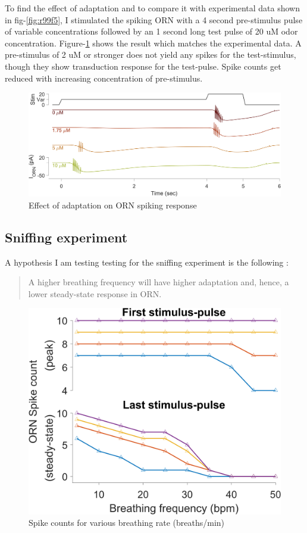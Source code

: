 \documentclass[
]{article}
\begin{document}
To find the effect of adaptation and to compare it with experimental data shown in fig-\ref{fig:r99f5}, I stimulated the spiking ORN with a 4 second pre-stimulus pulse of variable concentrations followed by an 1 second long test pulse of 20 uM odor concentration. Figure-\ref{fig:rAdp} shows the result which matches the experimental data. A pre-stimulus of 2 uM or stronger does not yield any spikes for the test-stimulus, though they show transduction response for the test-pulse. Spike counts get reduced with increasing concentration of pre-stimulus.

\begin{figure}

{\centering \includegraphics[width=0.9\linewidth]{figs/v1/fig_spk_compare_adaptation} 

}

\caption{Effect of adaptation on ORN spiking response}\label{fig:rAdp}
\end{figure}

\hypertarget{sniffing-experiment-1}{%
\subsection{Sniffing experiment}\label{sniffing-experiment-1}}

A hypothesis I am testing testing for the sniffing experiment is the following :

\begin{quote}
A higher breathing frequency will have higher adaptation and, hence, a lower steady-state response in ORN.
\end{quote}

\begin{figure}

{\centering \includegraphics[width=0.5\linewidth]{figs/v1/fig_sniff_freq_FR_tuning_raw} 

}

\caption{Spike counts for various breathing rate (breaths/min)}\label{fig:rSen1}
\end{figure}
\end{document}

